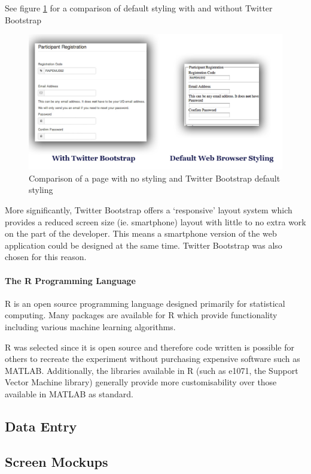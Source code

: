 See figure \ref{twitterbootstrap} for a comparison of default styling with and without Twitter Bootstrap
\begin{figure}[h!]
\includegraphics[width=120mm]{img/twitterbootstrap.jpg}
\caption{Comparison of a page with no styling and Twitter Bootstrap default styling}
\label{twitterbootstrap}
\end{figure}

More significantly, Twitter Bootstrap offers a `responsive' layout 
system which provides a reduced screen size (ie. smartphone) layout
 with little to no extra work on the part of the developer. This 
 means a smartphone version of the web application could be designed
  at the same time. Twitter Bootstrap was also chosen for this reason.
  
\paragraph{The R Programming Language}
R is an open source programming language designed primarily for statistical computing.
Many packages are available for R which provide functionality including various
machine learning algorithms.

R was selected since it is open source and therefore code written is possible for others to recreate
the experiment without purchasing expensive software such as MATLAB. Additionally, the libraries
available in R (such as e1071, the Support Vector Machine library) generally provide more customisability
over those available in MATLAB as standard.

\subsection{Data Entry}
\subsection{Screen Mockups}

